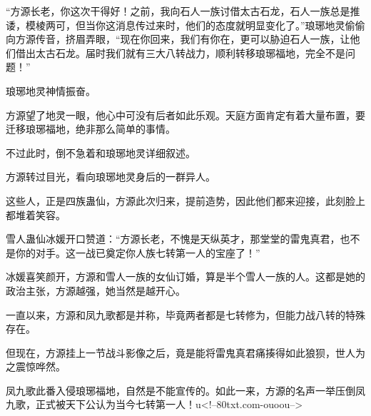 \begin{this_body}
“方源长老，你这次干得好！之前，我向石人一族讨借太古石龙，石人一族总是推诿，模棱两可，但当你这消息传过来时，他们的态度就明显变化了。”琅琊地灵偷偷向方源传音，挤眉弄眼，“现在你回来，我们有你在，更可以胁迫石人一族，让他们借出太古石龙。届时我们就有三大八转战力，顺利转移琅琊福地，完全不是问题！”

琅琊地灵神情振奋。

方源望了地灵一眼，他心中可没有后者如此乐观。天庭方面肯定有着大量布置，要迁移琅琊福地，绝非那么简单的事情。

不过此时，倒不急着和琅琊地灵详细叙述。

方源转过目光，看向琅琊地灵身后的一群异人。

这些人，正是四族蛊仙，方源此次归来，提前造势，因此他们都来迎接，此刻脸上都堆着笑容。

雪人蛊仙冰媛开口赞道：“方源长老，不愧是天纵英才，那堂堂的雷鬼真君，也不是你的对手。这一战已奠定你人族七转第一人的宝座了！”

冰媛喜笑颜开，方源和雪人一族的女仙订婚，算是半个雪人一族的人。这都是她的政治主张，方源越强，她当然是越开心。

一直以来，方源和凤九歌都是并称，毕竟两者都是七转修为，但能力战八转的特殊存在。

但现在，方源挂上一节战斗影像之后，竟是能将雷鬼真君痛揍得如此狼狈，世人为之震惊哗然。

凤九歌此番入侵琅琊福地，自然是不能宣传的。如此一来，方源的名声一举压倒凤九歌，正式被天下公认为当今七转第一人！u<!--80txt.com-ouoou-->

\end{this_body}


